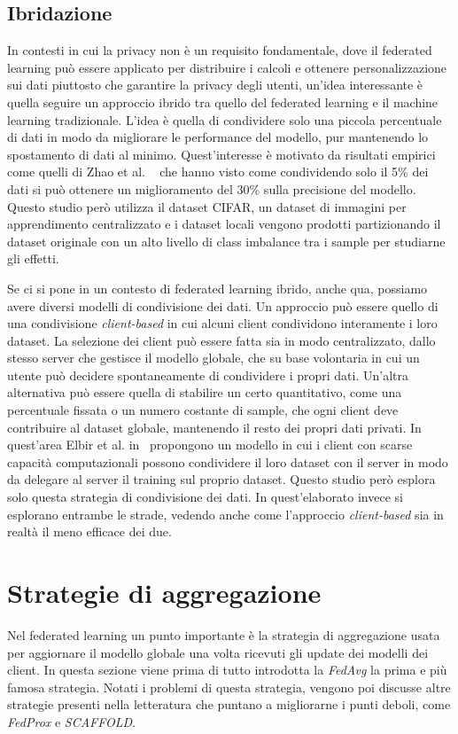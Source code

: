 \subsection{Ibridazione}
In contesti in cui la privacy non è un requisito fondamentale, dove il
federated learning può essere applicato per distribuire i calcoli e 
ottenere personalizzazione sui dati piuttosto che garantire la privacy
degli utenti, un'idea interessante è quella seguire un approccio ibrido 
tra quello del federated learning e il machine learning tradizionale.
L'idea è quella di condividere solo una piccola percentuale di dati 
in modo da migliorare le performance del modello, pur mantenendo lo 
spostamento di dati al minimo. Quest'interesse è motivato da risultati 
empirici come quelli di Zhao et al. ~\cite{zhao2018flniid} che hanno 
visto come condividendo solo il 5\% dei dati si può ottenere un 
miglioramento del 30\% sulla precisione del modello. Questo studio 
però utilizza il dataset CIFAR, un dataset di immagini per apprendimento 
centralizzato e i dataset locali vengono prodotti partizionando il 
dataset originale con un alto livello di class imbalance tra i 
sample per studiarne gli effetti. 

Se ci si pone in un contesto di federated learning ibrido, anche qua,
possiamo avere diversi modelli di condivisione dei dati. Un approccio 
può essere quello di una condivisione \textit{client-based} in cui alcuni client 
condividono interamente i loro dataset. La selezione dei client può 
essere fatta sia in modo centralizzato, dallo stesso server che gestisce 
il modello globale, che su base volontaria in cui un utente può decidere 
spontaneamente di condividere i propri dati.
Un'altra alternativa può essere quella di stabilire un certo quantitativo,
come una percentuale fissata o un numero costante di sample, che ogni 
client deve contribuire al dataset globale, mantenendo il resto dei 
propri dati privati. 
In quest'area Elbir et al. in~\cite{Elbir2020HybridFA, Elbir2021AHA} 
propongono un modello 
in cui i client con scarse capacità computazionali possono condividere il 
loro dataset con il server in modo da delegare al server il training sul 
proprio dataset. Questo studio però esplora solo questa strategia di 
condivisione dei dati. In quest'elaborato invece si esplorano 
entrambe le strade, vedendo anche come l'approccio \textit{client-based} 
sia in realtà il meno efficace dei due.


\section{Strategie di aggregazione}
Nel federated learning un punto importante è la strategia di aggregazione
usata per aggiornare il modello globale una volta ricevuti gli update 
dei modelli dei client. In questa sezione viene prima di tutto introdotta 
la \textit{FedAvg} la prima e più famosa strategia. Notati i problemi 
di questa strategia, vengono poi discusse altre strategie presenti 
nella letteratura che puntano a migliorarne i punti deboli, come 
\textit{FedProx} e \textit{SCAFFOLD}.

